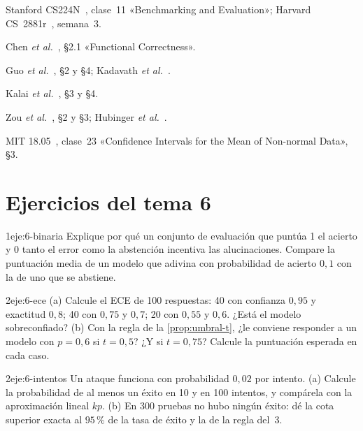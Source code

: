 \begin{lecturas}
\item Stanford CS224N~\cite{cs224n}, clase~11 «Benchmarking and Evaluation»; Harvard CS~2881r~\cite{cs2881}, semana~3.
\item Chen \emph{et al.}~\cite{chen}, §2.1 «Functional Correctness».
\item Guo \emph{et al.}~\cite{guo}, §2 y §4; Kadavath \emph{et al.}~\cite{kadavath}.
\item Kalai \emph{et al.}~\cite{kalai25}, §3 y §4.
\item Zou \emph{et al.}~\cite{zou}, §2 y §3; Hubinger \emph{et al.}~\cite{hubinger}.
\item MIT 18.05~\cite{mit1805}, clase~23 «Confidence Intervals for the Mean of Non-normal Data», §3.
\end{lecturas}

\section*{Ejercicios del tema 6}

\begin{ejercicio}{1}{eje:6-binaria}
Explique por qué un conjunto de evaluación que puntúa 1 el acierto y 0 tanto el error como la abstención incentiva las alucinaciones. Compare la puntuación media de un modelo que adivina con probabilidad de acierto $0{,}1$ con la de uno que se abstiene.
\end{ejercicio}

\begin{ejercicio}{2}{eje:6-ece}
(a) Calcule el ECE de 100 respuestas: 40 con confianza $0{,}95$ y exactitud $0{,}8$; 40 con $0{,}75$ y $0{,}7$; 20 con $0{,}55$ y $0{,}6$. ¿Está el modelo sobreconfiado? (b) Con la regla de la \cref{prop:umbral-t}, ¿le conviene responder a un modelo con $p=0{,}6$ si $t=0{,}5$? ¿Y si $t=0{,}75$? Calcule la puntuación esperada en cada caso.
\end{ejercicio}

\begin{ejercicio}{2}{eje:6-intentos}
Un ataque funciona con probabilidad $0{,}02$ por intento. (a) Calcule la probabilidad de al menos un éxito en 10 y en 100 intentos, y compárela con la aproximación lineal $kp$. (b) En 300 pruebas no hubo ningún éxito: dé la cota superior exacta al $95\,\%$ de la tasa de éxito y la de la regla del~3.
\end{ejercicio}

